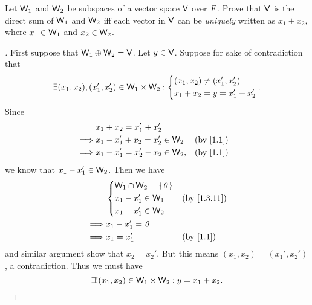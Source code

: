 \begin{ex}\label{ex:1.3.30}
  Let \(\mathsf{W}_1\) and \(\mathsf{W}_2\) be subspaces of a vector space \(\mathsf{V}\) over \(\mathit{F}\).
  Prove that \(\mathsf{V}\) is the direct sum of \(\mathsf{W}_1\) and \(\mathsf{W}_2\) iff each vector in \(\mathsf{V}\) can be \emph{uniquely} written as \(x_1 + x_2\), where \(x_1 \in \mathsf{W}_1\) and \(x_2 \in \mathsf{W}_2\).
\end{ex}

\begin{proof}[]
  First suppose that \(\mathsf{W}_1 \oplus \mathsf{W}_2 = \mathsf{V}\).
  Let \(y \in \mathsf{V}\).
  Suppose for sake of contradiction that
  \[
    \exists (x_1, x_2), (x_1', x_2') \in \mathsf{W}_1 \times \mathsf{W}_2 : \begin{dcases}
      (x_1, x_2) \neq (x_1', x_2') \\
      x_1 + x_2 = y = x_1' + x_2'
    \end{dcases}.
  \]
  Since
  \begin{align*}
             & x_1 + x_2 = x_1' + x_2'                         \\
    \implies & x_1 - x_1' + x_2 = x_2' \in \W_2  &  & \by{1.1} \\
    \implies & x_1 - x_1' = x_2' - x_2 \in \W_2, &  & \by{1.1}
  \end{align*}
  we know that \(x_1 - x_1' \in \mathsf{W}_2\).
  Then we have
  \begin{align*}
             & \begin{dcases}
                 \W_1 \cap \W_2 = \set{\zv} \\
                 x_1 - x_1' \in \W_1        \\
                 x_1 - x_1' \in \W_2
               \end{dcases} &  & \by{1.3.11}               \\
    \implies & x_1 - x_1' = \zv                            \\
    \implies & x_1 = x_1'                    &  & \by{1.1}
  \end{align*}
  and similar argument show that \(x_2 = x_2'\).
  But this means \((x_1, x_2) = (x_1', x_2')\), a contradiction.
  Thus we must have
  \[
    \exists! (x_1, x_2) \in \mathsf{W}_1 \times \mathsf{W}_2 : y = x_1 + x_2.
  \]


\end{proof}
